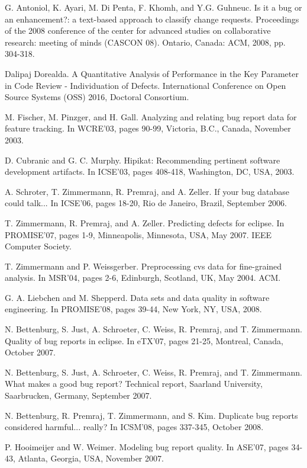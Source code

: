 \begin{thebibliography}{99.}
 G. Antoniol, K. Ayari, M. Di Penta, F. Khomh, and Y.G. Guhneuc. 
Is it a bug or an enhancement?: a text-based approach to classify change requests. 
Proceedings of the 2008 conference of the center for advanced studies on collaborative research: 
meeting of minds (CASCON 08). Ontario, Canada: ACM, 2008, pp. 304-318.

 Dalipaj Dorealda. A Quantitative Analysis of Performance in the Key Parameter in Code Review - Individuation
of Defects. International Conference on Open Source Systems (OSS) 2016, Doctoral Consortium.

 M. Fischer, M. Pinzger, and H. Gall. Analyzing and relating bug report data for 
feature tracking. In WCRE'03, pages 90-99, Victoria, B.C., Canada, November 2003.

 D. Cubranic and G. C. Murphy. Hipikat: Recommending pertinent software development 
artifacts. In ICSE'03, pages 408-418, Washington, DC, USA, 2003.

  A. Schroter, T. Zimmermann, R. Premraj, and A. Zeller. If your bug database could 
talk... In ICSE'06, pages 18-20, Rio de Janeiro, Brazil, September 2006.

 T. Zimmermann, R. Premraj, and A. Zeller. Predicting defects for eclipse. In PROMISE'07, 
pages 1-9, Minneapolis, Minnesota, USA, May 2007. IEEE Computer Society.

 T. Zimmermann and P. Weissgerber. Preprocessing cvs data for fine-grained analysis. In 
MSR'04, pages 2-6, Edinburgh, Scotland, UK, May 2004. ACM.

  G. A. Liebchen and M. Shepperd. Data sets and data quality in software engineering. In 
PROMISE'08, pages 39-44, New York, NY, USA, 2008.

 N. Bettenburg, S. Just, A. Schroeter, C. Weiss, R. Premraj, and T. Zimmermann. Quality of 
bug reports in eclipse. In eTX'07, pages 21-25, Montreal, Canada, October 2007.

 N. Bettenburg, S. Just, A. Schroeter, C. Weiss, R. Premraj, and T. Zimmermann. 
What makes a good bug report? Technical report, Saarland University, Saarbrucken, Germany, September 2007.

 N. Bettenburg, R. Premraj, T. Zimmermann, and S. Kim. Duplicate bug reports considered 
harmful... really? In ICSM'08, pages 337-345, October 2008.

 P. Hooimeijer and W. Weimer. Modeling bug report quality. In ASE'07, pages 34-43, Atlanta, 
Georgia, USA, November 2007.


\end{thebibliography}

